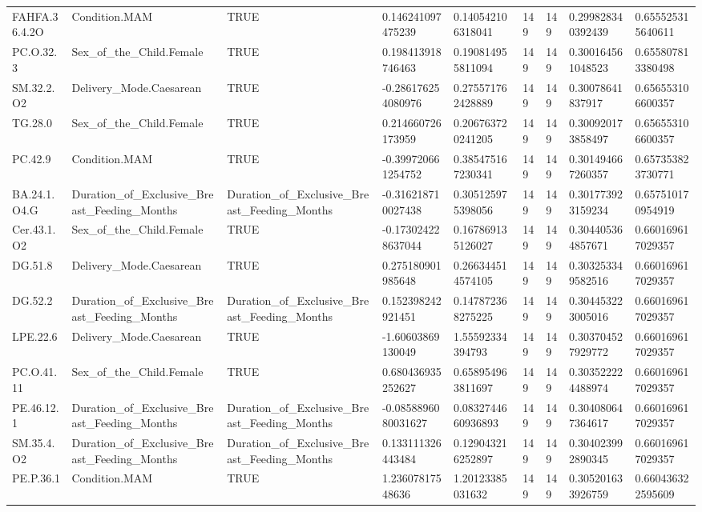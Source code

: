 \begin{longtable}{lllllllll}
FAHFA.36.4.2O & Condition.MAM & TRUE & 0.146241097475239 & 0.140542106318041 & 149 & 149 & 0.299828340392439 & 0.655525315640611 \\
PC.O.32.3 & Sex\_of\_the\_Child.Female & TRUE & 0.198413918746463 & 0.190814955811094 & 149 & 149 & 0.300164561048523 & 0.655807813380498 \\
SM.32.2.O2 & Delivery\_Mode.Caesarean & TRUE & -0.286176254080976 & 0.275571762428889 & 149 & 149 & 0.30078641837917 & 0.656553106600357 \\
TG.28.0 & Sex\_of\_the\_Child.Female & TRUE & 0.214660726173959 & 0.206763720241205 & 149 & 149 & 0.300920173858497 & 0.656553106600357 \\
PC.42.9 & Condition.MAM & TRUE & -0.399720661254752 & 0.385475167230341 & 149 & 149 & 0.301494667260357 & 0.657353823730771 \\
BA.24.1.O4.G & Duration\_of\_Exclusive\_Breast\_Feeding\_Months & Duration\_of\_Exclusive\_Breast\_Feeding\_Months & -0.316218710027438 & 0.305125975398056 & 149 & 149 & 0.301773923159234 & 0.657510170954919 \\
Cer.43.1.O2 & Sex\_of\_the\_Child.Female & TRUE & -0.173024228637044 & 0.167869135126027 & 149 & 149 & 0.304405364857671 & 0.660169617029357 \\
DG.51.8 & Delivery\_Mode.Caesarean & TRUE & 0.275180901985648 & 0.266344514574105 & 149 & 149 & 0.303253349582516 & 0.660169617029357 \\
DG.52.2 & Duration\_of\_Exclusive\_Breast\_Feeding\_Months & Duration\_of\_Exclusive\_Breast\_Feeding\_Months & 0.152398242921451 & 0.147872368275225 & 149 & 149 & 0.304453223005016 & 0.660169617029357 \\
LPE.22.6 & Delivery\_Mode.Caesarean & TRUE & -1.60603869130049 & 1.55592334394793 & 149 & 149 & 0.303704527929772 & 0.660169617029357 \\
PC.O.41.11 & Sex\_of\_the\_Child.Female & TRUE & 0.680436935252627 & 0.658954963811697 & 149 & 149 & 0.303522224488974 & 0.660169617029357 \\
PE.46.12.1 & Duration\_of\_Exclusive\_Breast\_Feeding\_Months & Duration\_of\_Exclusive\_Breast\_Feeding\_Months & -0.0858896080031627 & 0.0832744660936893 & 149 & 149 & 0.304080647364617 & 0.660169617029357 \\
SM.35.4.O2 & Duration\_of\_Exclusive\_Breast\_Feeding\_Months & Duration\_of\_Exclusive\_Breast\_Feeding\_Months & 0.133111326443484 & 0.129043216252897 & 149 & 149 & 0.304023992890345 & 0.660169617029357 \\
PE.P.36.1 & Condition.MAM & TRUE & 1.23607817548636 & 1.20123385031632 & 149 & 149 & 0.305201633926759 & 0.660436322595609 \\

\end{longtable}
